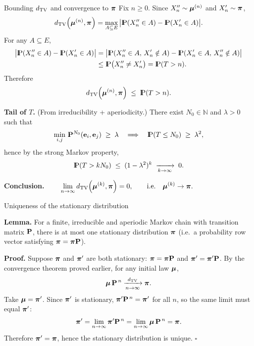 \documentclass[aspectratio=169]{beamer}
\newcommand{\Prob}{{\rm I\hspace{-0.8mm}P}}
\newcommand{\e}[0]{\textbf{e}}
\begin{document}
\begin{frame}{Bounding \(d_{\rm TV}\) and convergence to \(\mbox{\boldmath$\pi$}\)}
\small
Fix \(n\ge0\). Since \(X''_n\sim\mbox{\boldmath $\mu$}^{(n)}\) and \(X'_n\sim\mbox{\boldmath$\pi$}\),
\[
d_{\rm TV}\!\left(\bfmu^{(n)},\bfpi\right)
=\max_{A\subseteq E}\big|\Prob(X''_n\in A)-\Prob(X'_n\in A)\big|.
\]
For any \(A\subseteq E\),
\[
\begin{aligned}
\big|\Prob(X''_n\in A)-\Prob(X'_n\in A)\big|
&=\big|\Prob(X''_n\in A,\,X'_n\notin A)-\Prob(X'_n\in A,\,X''_n\notin A)\big|\\
&\le \Prob\big(X''_n\neq X'_n\big)
= \Prob(T>n).
\end{aligned}
\]
Therefore
\[
d_{\rm TV}\!\left(\bfmu^{(n)},\bfpi\right)\;\le\;\Prob(T>n).
\]

\medskip
\textbf{Tail of \(T\).} (From irreducibility + aperiodicity.)
There exist \(N_0\in\mathbb{N}\) and \(\lambda>0\) such that
\[
\min_{i,j}\, \bfP^{N_0}(\e_i,\e_j)\;\ge\;\lambda
\quad\Longrightarrow\quad
\Prob(T\le N_0)\;\ge\;\lambda^2,
\]
hence by the strong Markov property,
\[
\Prob(T>kN_0)\;\le\;(1-\lambda^2)^k\;\xrightarrow[k\to\infty]{}\;0.
\]

\medskip
\textbf{Conclusion.} $\qquad \displaystyle
\lim_{n\to\infty} d_{\rm TV}\!\left(\mbox{\boldmath $\mu$}^{(k)},\mbox{\boldmath$\pi$}\right)=0,
\qquad\text{i.e.}\quad \mbox{\boldmath $\mu$}^{(k)}\to\mbox{\boldmath$\pi$}.
$
\end{frame}

\begin{frame}[t]{Uniqueness of the stationary distribution}

\textbf{Lemma.}
For a finite, irreducible and aperiodic Markov chain with transition matrix \(\mathbf{P}\),
there is at most one stationary distribution \(\mbox{\boldmath$\pi$}\)
(i.e.\ a probability row vector satisfying \(\mbox{\boldmath$\pi$}=\mbox{\boldmath$\pi$}\mathbf{P}\)).

\medskip
\textbf{Proof.}
Suppose \(\mbox{\boldmath$\pi$}\) and \(\mbox{\boldmath$\pi$}'\) are both stationary:
\(\mbox{\boldmath$\pi$}=\mbox{\boldmath$\pi$}\mathbf{P}\) and \(\mbox{\boldmath$\pi$}'=\mbox{\boldmath$\pi$}'\mathbf{P}\).
By the convergence theorem proved earlier, for any initial law \(\mbox{\boldmath $\mu$}\),
\[
\mbox{\boldmath $\mu$}\,\mathbf{P}^{\,n}\xrightarrow[n\to\infty]{d_{\rm TV}} \mbox{\boldmath$\pi$} .
\]
Take \(\mbox{\boldmath $\mu$}=\mbox{\boldmath$\pi$}'\).
Since \(\mbox{\boldmath$\pi$}'\) is stationary, \(\mbox{\boldmath$\pi$}'\mathbf{P}^{\,n}=\mbox{\boldmath$\pi$}'\) for all \(n\),
so the same limit must equal \(\mbox{\boldmath$\pi$}'\):
\[
\mbox{\boldmath$\pi$}'=\lim_{n\to\infty}\mbox{\boldmath$\pi$}'\mathbf{P}^{\,n}
=\lim_{n\to\infty}\mbox{\boldmath $\mu$}\,\mathbf{P}^{\,n}
=\mbox{\boldmath$\pi$}.
\]
Therefore \(\mbox{\boldmath$\pi$}'=\mbox{\boldmath$\pi$}\),
hence the stationary distribution is unique.
\hfill$\square$

\end{frame}
\end{document}
